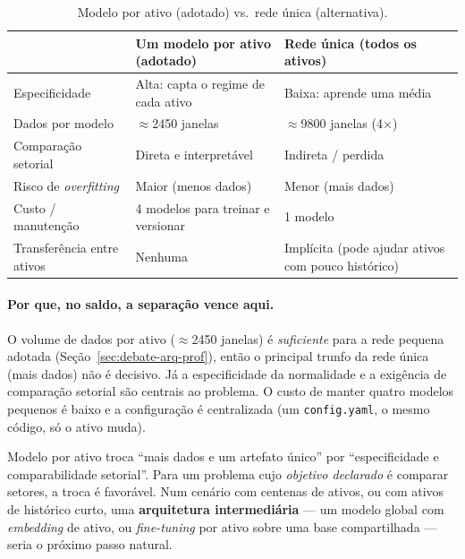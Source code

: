 \begin{table}[h]
\centering
\caption{Modelo por ativo (adotado) vs.\ rede única (alternativa).}
\label{tab:multi}
\renewcommand{\arraystretch}{1.2}
\begin{tabular}{p{4.0cm} p{4.6cm} p{4.9cm}}
\toprule
 & \textbf{Um modelo por ativo (adotado)} & \textbf{Rede única (todos os ativos)} \\
\midrule
Especificidade & Alta: capta o regime de cada ativo & Baixa: aprende uma média \\
Dados por modelo & $\approx$2450 janelas & $\approx$9800 janelas (4$\times$) \\
Comparação setorial & Direta e interpretável & Indireta / perdida \\
Risco de \emph{overfitting} & Maior (menos dados) & Menor (mais dados) \\
Custo / manutenção & 4 modelos para treinar e versionar & 1 modelo \\
Transferência entre ativos & Nenhuma & Implícita (pode ajudar ativos com pouco histórico) \\
\bottomrule
\end{tabular}
\end{table}

\paragraph{Por que, no saldo, a separação vence aqui.} O volume de dados por
ativo ($\approx$2450 janelas) é \emph{suficiente} para a rede pequena adotada
(Seção~\ref{sec:debate-arq-prof}), então o principal trunfo da rede única (mais
dados) não é decisivo. Já a especificidade da normalidade e a exigência de
comparação setorial são centrais ao problema. O custo de manter quatro modelos
pequenos é baixo e a configuração é centralizada (um \texttt{config.yaml}, o
mesmo código, só o ativo muda).

\begin{tradeoff}
Modelo por ativo troca ``mais dados e um artefato único'' por ``especificidade e
comparabilidade setorial''. Para um problema cujo \emph{objetivo declarado} é
comparar setores, a troca é favorável. Num cenário com centenas de ativos, ou
com ativos de histórico curto, uma \textbf{arquitetura intermediária} ---
um modelo global com \emph{embedding} de ativo, ou \emph{fine-tuning} por ativo
sobre uma base compartilhada --- seria o próximo passo natural.
\end{tradeoff}
